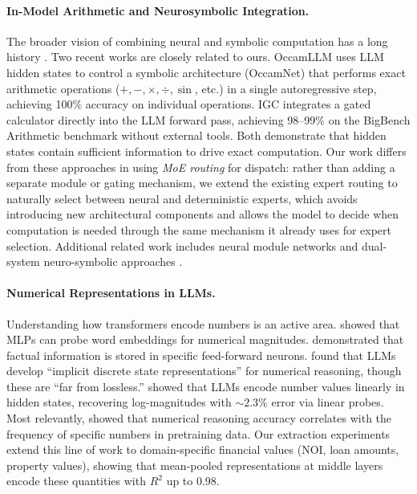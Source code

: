 \paragraph{In-Model Arithmetic and Neurosymbolic Integration.}
The broader vision of combining neural and symbolic computation has a
long history \citep{garcez2019neural}. Two recent works are closely
related to ours. OccamLLM \citep{deleo2024occamllm} uses LLM hidden
states to control a symbolic architecture (OccamNet) that performs
exact arithmetic operations ($+, -, \times, \div, \sin$, etc.) in a
single autoregressive step, achieving 100\% accuracy on individual
operations. IGC \citep{dietz2025igc} integrates a gated calculator
directly into the LLM forward pass, achieving 98--99\% on the BigBench
Arithmetic benchmark without external tools. Both demonstrate that
hidden states contain sufficient information to drive exact computation.
Our work differs from these approaches in using \emph{MoE routing} for
dispatch: rather than adding a separate module or gating mechanism, we
extend the existing expert routing to naturally select between neural and
deterministic experts, which avoids introducing new architectural
components and allows the model to decide when computation is needed
through the same mechanism it already uses for expert selection.
Additional related work includes neural module networks
\citep{andreas2016neural} and dual-system neuro-symbolic approaches
\citep{nye2021improving,baydin2018automatic}.

\paragraph{Numerical Representations in LLMs.}
Understanding how transformers encode numbers is an active area.
\citet{wallace2019nlp} showed that MLPs can probe word embeddings for
numerical magnitudes. \citet{geva2023dissecting} demonstrated that
factual information is stored in specific feed-forward neurons.
\citet{chen2024states} found that LLMs develop ``implicit discrete
state representations'' for numerical reasoning, though these are ``far
from lossless.'' \citet{bai2025numbers} showed that LLMs encode number
values linearly in hidden states, recovering log-magnitudes with
${\sim}2.3\%$ error via linear probes. Most relevantly,
\citet{razeghi2022impact} showed that numerical reasoning accuracy
correlates with the frequency of specific numbers in pretraining data.
Our extraction experiments extend this line of work to domain-specific
financial values (NOI, loan amounts, property values), showing that
mean-pooled representations at middle layers encode these quantities
with $R^2$ up to 0.98.
